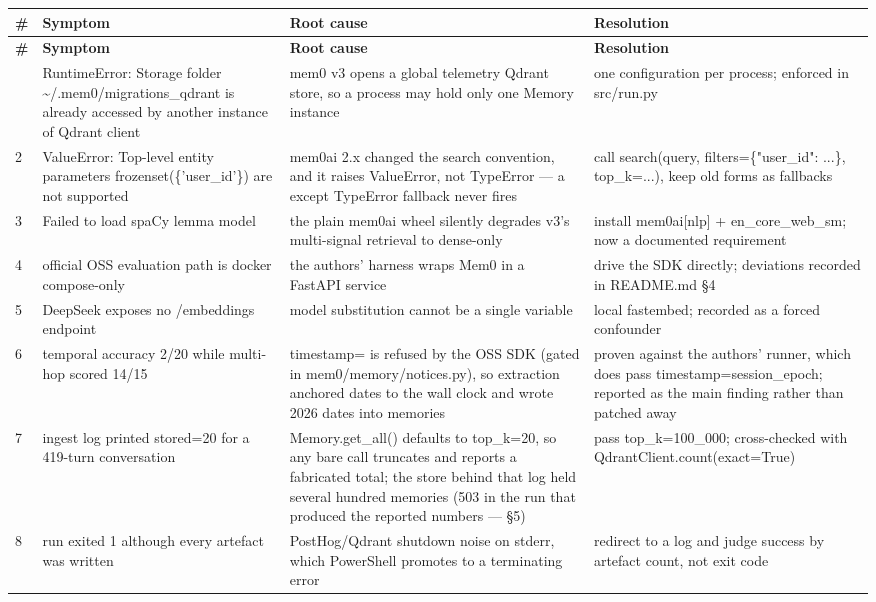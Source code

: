 \documentclass[11pt,a4paper]{article}
\begin{document}
{\small
\begin{xltabular}{\textwidth}{@{}l>{\RaggedRight\arraybackslash}X>{\RaggedRight\arraybackslash}X>{\RaggedRight\arraybackslash}X@{}}
\toprule
\textbf{\#} & \textbf{Symptom} & \textbf{Root cause} & \textbf{Resolution} \\
\midrule
\endfirsthead
\toprule
\textbf{\#} & \textbf{Symptom} & \textbf{Root cause} & \textbf{Resolution} \\
\midrule
\endhead
\bottomrule
{} & RuntimeError: Storage folder \textasciitilde{}/.mem0/migrations\_qdrant is already accessed by another instance of Qdrant client & mem0 v3 opens a global telemetry Qdrant store, so a process may hold only one Memory instance & one configuration per process; enforced in src/run.py \\
2 & ValueError: Top-level entity parameters frozenset(\{'user\_id'\}) are not supported & mem0ai 2.x changed the search convention, and it raises ValueError, not TypeError --- a except TypeError fallback never fires & call search(query, filters=\{"user\_id": ...\}, top\_k=...), keep old forms as fallbacks \\
3 & Failed to load spaCy lemma model & the plain mem0ai wheel silently degrades v3's multi-signal retrieval to dense-only & install mem0ai[nlp] + en\_core\_web\_sm; now a documented requirement \\
4 & official OSS evaluation path is docker compose-only & the authors' harness wraps Mem0 in a FastAPI service & drive the SDK directly; deviations recorded in README.md §4 \\
5 & DeepSeek exposes no /embeddings endpoint & model substitution cannot be a single variable & local fastembed; recorded as a forced confounder \\
6 & temporal accuracy 2/20 while multi-hop scored 14/15 & timestamp= is refused by the OSS SDK (gated in mem0/memory/notices.py), so extraction anchored dates to the wall clock and wrote 2026 dates into memories & proven against the authors' runner, which does pass timestamp=session\_epoch; reported as the main finding rather than patched away \\
7 & ingest log printed stored=20 for a 419-turn conversation & Memory.get\_all() defaults to top\_k=20, so any bare call truncates and reports a fabricated total; the store behind that log held several hundred memories (503 in the run that produced the reported numbers --- §5) & pass top\_k=100\_000; cross-checked with QdrantClient.count(exact=True) \\
8 & run exited 1 although every artefact was written & PostHog/Qdrant shutdown noise on stderr, which PowerShell promotes to a terminating error & redirect to a log and judge success by artefact count, not exit code \\

\end{xltabular}}
\end{document}
